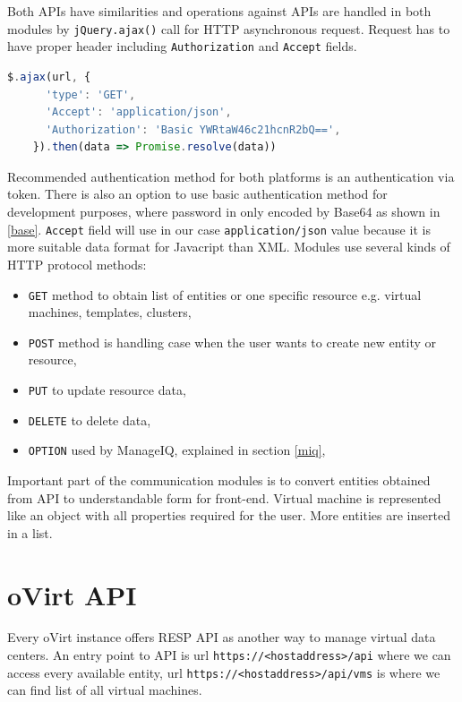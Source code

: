 Both APIs have similarities and operations against APIs are handled in both modules by \texttt{jQuery.ajax()}\cite{ajax} call for HTTP asynchronous request.
Request has to have proper header including \texttt{Authorization} and \texttt{Accept} fields. 

\bigskip
\begin{lstlisting}[language=javascript,xleftmargin=3.5ex,caption={Fetching data from ManageIQ with Basic Authentication}]
$.ajax(url, {
      'type': 'GET',
      'Accept': 'application/json',
      'Authorization': 'Basic YWRtaW46c21hcnR2bQ==',
    }).then(data => Promise.resolve(data))
\end{lstlisting}\label{base}
\bigskip
  
Recommended authentication method for both platforms is an authentication via token. There is also an option to use basic authentication method for development purposes, where password in only encoded by Base64 as shown in \ref{base}.
\texttt{Accept} field will use in our case \texttt{application/json} value because it is more suitable data format for Javacript than XML. Modules use several kinds of HTTP protocol methods: 
\begin{itemize}
\item \texttt{GET} method to obtain list of entities or one specific resource e.g. virtual machines, templates, clusters,
\item \texttt{POST} method is handling case when the user wants to create new entity or resource,
\item \texttt{PUT} to update resource data,
\item \texttt{DELETE} to delete data,
\item \texttt{OPTION} used by ManageIQ, explained in section \ref{miq},
\end{itemize}

Important part of the communication modules is to convert entities obtained from API to understandable form for front-end. Virtual machine is represented like an object with all properties required for the user. More entities are inserted in a list.

\section{oVirt API}
Every oVirt instance offers RESP API as another way to manage virtual data centers. An entry point to API is url \texttt{https://<hostaddress>/api} where we can access every available entity, url \texttt{https://<hostaddress>/api/vms} is where we can find list of all virtual machines.

